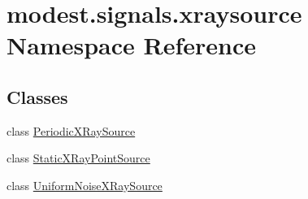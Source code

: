 \hypertarget{namespacemodest_1_1signals_1_1xraysource}{}\section{modest.\+signals.\+xraysource Namespace Reference}
\label{namespacemodest_1_1signals_1_1xraysource}
\subsection*{Classes}
\begin{DoxyCompactItemize}
\item 
class \hyperlink{classmodest_1_1signals_1_1xraysource_1_1PeriodicXRaySource}{Periodic\+X\+Ray\+Source}
\item 
class \hyperlink{classmodest_1_1signals_1_1xraysource_1_1StaticXRayPointSource}{Static\+X\+Ray\+Point\+Source}
\item 
class \hyperlink{classmodest_1_1signals_1_1xraysource_1_1UniformNoiseXRaySource}{Uniform\+Noise\+X\+Ray\+Source}
\end{DoxyCompactItemize}

